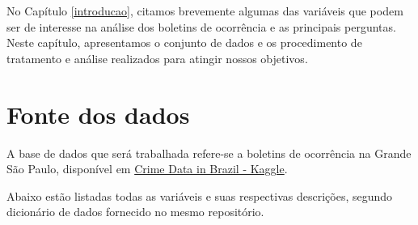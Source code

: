 \documentclass[
  12pt,
  portuguese,
]{report}
\begin{document}
No Capítulo \ref{introducao}, citamos brevemente algumas das variáveis que podem ser de interesse na análise dos boletins de ocorrência e as principais perguntas. Neste capítulo, apresentamos o conjunto de dados e os procedimento de tratamento e análise realizados para atingir nossos objetivos.

\hypertarget{fonte-dos-dados}{%
\section{Fonte dos dados}\label{fonte-dos-dados}}

A base de dados que será trabalhada refere-se a boletins de ocorrência na Grande São Paulo, disponível em \href{https://www.kaggle.com/inquisitivecrow/crime-data-in-brazil}{Crime Data in Brazil - Kaggle}.

Abaixo estão listadas todas as variáveis e suas respectivas descrições, segundo dicionário de dados fornecido no mesmo repositório.
\end{document}

